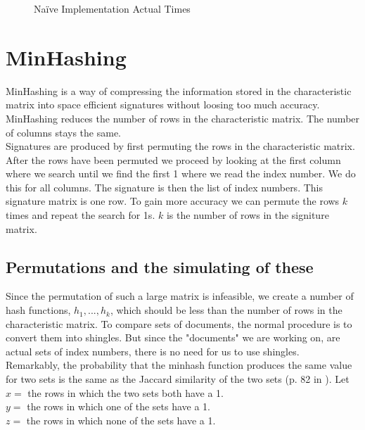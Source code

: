 \documentclass[a4paper,11pt]{article}
\begin{document}
\begin{figure}[!htbp]
    \begin{center}
        
        \caption{Naïve Implementation Actual Times}
        \label{fig:naive_at}
    \end{center}
\end{figure}


\section{MinHashing}\label{sec:minhashing}
MinHashing is a way of compressing the information stored in the characteristic matrix into space efficient signatures without loosing too much accuracy. MinHashing reduces the number of rows in the characteristic matrix. The number of columns stays the same.\\

Signatures are produced by first permuting the rows in the characteristic matrix. After the rows have been permuted we proceed by looking at the first column where we search until we find the first 1 where we read the index number. We do this for all columns. The signature is then the list of index numbers. This signature matrix is one row. To gain more accuracy we can permute the rows $k$ times and repeat the search for 1s. $k$ is the number of rows in the signiture matrix.

\subsection{Permutations and the simulating of these}
Since the permutation of such a large matrix is infeasible, we create a number of hash functions, $h_1, ..., h_k$, which should be less than the number of rows in the characteristic matrix. To compare sets of documents, the normal procedure is to convert them into shingles. But since the "documents" we are working on, are actual sets of index numbers, there is no need for us to use shingles. \\

Remarkably, the probability that the minhash function produces the same value for two sets is the same as the Jaccard similarity of the two sets (p. 82 in \cite{book:mmds}). Let \\

    $x = $ the rows in which the two sets both have a 1. \\
    $y = $ the rows in which one of the sets have a 1. \\
    $z = $ the rows in which none of the sets have a 1. \\
\end{document}
